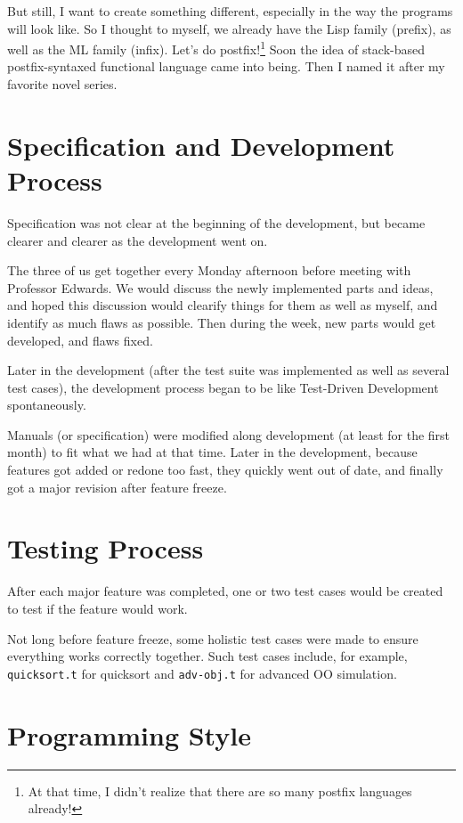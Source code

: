 \documentclass{report}
\begin{document}
But still, I want to create something different, especially in the way the programs will look like. So I thought to myself, we already have the Lisp family (prefix), as well as the ML family (infix). Let's do postfix!\footnote{At that time, I didn't realize that there are so many postfix languages already!} Soon the idea of stack-based postfix-syntaxed functional language came into being. Then I named it after my favorite novel series.

\section{Specification and Development Process}

Specification was not clear at the beginning of the development, but became clearer and clearer as the development went on.

The three of us get together every Monday afternoon before meeting with Professor Edwards. We would discuss the newly implemented parts and ideas, and hoped this discussion would clearify things for them as well as myself, and identify as much flaws as possible. Then during the week, new parts would get developed, and flaws fixed.

Later in the development (after the test suite was implemented as well as several test cases), the development process began to be like Test-Driven Development spontaneously.

Manuals (or specification) were modified along development (at least for the first month) to fit what we had at that time. Later in the development, because features got added or redone too fast, they quickly went out of date, and finally got a major revision after feature freeze.

\section{Testing Process}

After each major feature was completed, one or two test cases would be created to test if the feature would work.

Not long before feature freeze, some holistic test cases were made to ensure everything works correctly together. Such test cases include, for example, \texttt{quicksort.t} for quicksort and \texttt{adv-obj.t} for advanced OO simulation.

\section{Programming Style}
\end{document}
